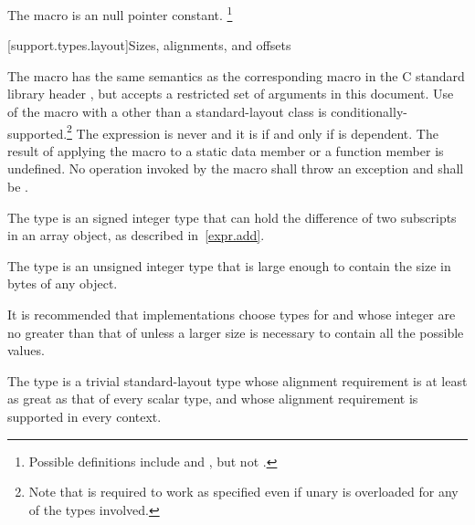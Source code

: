 \pnum
The macro
%
is an  null pointer constant.%
\footnote{Possible definitions include
and
,
but not
.}


[support.types.layout]{Sizes, alignments, and offsets}

\pnum
The macro
%
has the same semantics as the corresponding macro in
the C standard library header , but
accepts a restricted set of 
arguments in this document.
Use of the  macro with a 
other than a standard-layout class
is conditionally-supported.\footnote{Note that 
is required to work as specified even if unary
is overloaded for any of the types involved.}
The expression 
is never  and it is
 if and only if  is
dependent. The result of applying the  macro to
a static data member or a function member is undefined.
No operation invoked by the  macro shall throw an exception and
 shall be .

\pnum
The type  is an
signed integer type that can
hold the difference of two subscripts in an array object, as described in~\ref{expr.add}.

\pnum
The type  is an
unsigned integer type that is large enough
to contain the size in bytes of any object.

\pnum
\begin{note}
It is recommended that implementations choose types for  and 
whose integer  are no greater than that of
 unless a larger size is necessary to contain all the possible values.
\end{note}

\pnum
The type
%
 is a trivial standard-layout type whose alignment requirement
is at least as great as that of every scalar type, and whose alignment
requirement is supported in every context.

